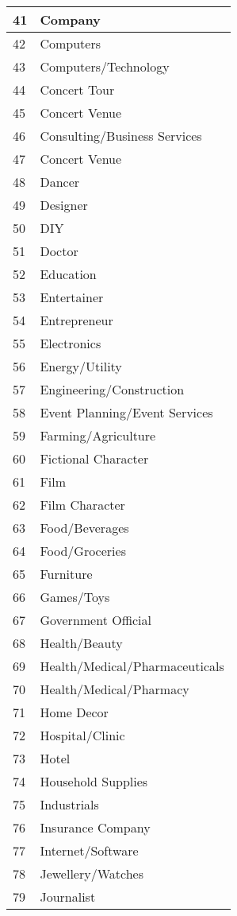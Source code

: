 \begin{longtable}{|p{1cm}|p{4in}|}
41&Company \\ \hline
42&Computers \\ \hline
43&Computers/Technology \\ \hline
44&Concert Tour \\ \hline
45&Concert Venue \\ \hline
46&Consulting/Business Services \\ \hline
47&Concert Venue \\ \hline
48&Dancer \\ \hline
49&Designer \\ \hline
50&DIY \\ \hline
51&Doctor \\ \hline
52&Education \\ \hline
53&Entertainer \\ \hline
54&Entrepreneur \\ \hline
55&Electronics \\ \hline
56&Energy/Utility \\ \hline
57&Engineering/Construction \\ \hline
58&Event Planning/Event Services \\ \hline
59&Farming/Agriculture \\ \hline
60&Fictional Character \\ \hline
61&Film \\ \hline
62&Film Character \\ \hline
63&Food/Beverages \\ \hline
64&Food/Groceries \\ \hline
65&Furniture \\ \hline
66&Games/Toys \\ \hline
67&Government Official \\ \hline
68&Health/Beauty \\ \hline
69&Health/Medical/Pharmaceuticals \\ \hline
70&Health/Medical/Pharmacy \\ \hline
71&Home Decor \\ \hline
72&Hospital/Clinic \\ \hline
73&Hotel \\ \hline
74&Household Supplies \\ \hline
75&Industrials \\ \hline
76&Insurance Company \\ \hline
77&Internet/Software \\ \hline
78&Jewellery/Watches \\ \hline
79&Journalist \\ \hline

\end{longtable}
